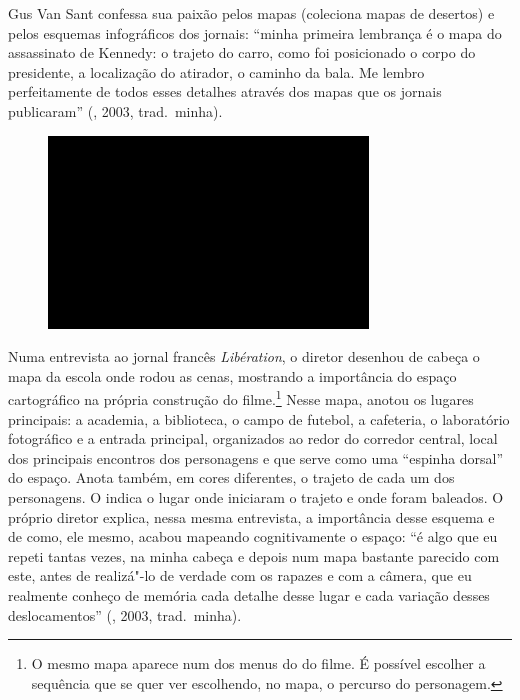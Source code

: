 Gus Van Sant confessa sua paixão pelos mapas (coleciona mapas de
desertos) e pelos esquemas infográficos dos jornais: ``minha primeira
lembrança é o mapa do assassinato de Kennedy: o trajeto do carro, como
foi posicionado o corpo do presidente, a localização do atirador, o
caminho da bala. Me lembro perfeitamente de todos esses detalhes através
dos mapas que os jornais publicaram'' (, 2003, trad.~minha).

\begin{figure}[!ht]

\centering
 \includegraphics[width=85mm]{./imgs/im1.jpg}
\caption{\tiny{}}

\end{figure}


Numa entrevista ao jornal francês \emph{Libération}, o diretor desenhou
de cabeça o mapa da escola onde rodou as cenas, mostrando a importância
do espaço cartográfico na própria construção do filme.\footnote{O mesmo
  mapa aparece num dos menus do  do filme. É possível escolher a
  sequência que se quer ver escolhendo, no mapa, o percurso do
  personagem.} Nesse mapa, anotou os lugares principais: a academia, a
biblioteca, o campo de futebol, a cafeteria, o laboratório fotográfico e
a entrada principal, organizados ao redor do corredor central, local dos
principais encontros dos personagens e que serve como uma ``espinha
dorsal'' do espaço. Anota também, em cores diferentes, o trajeto de cada
um dos personagens. O  indica o lugar onde iniciaram o trajeto e onde
foram baleados. O próprio diretor explica, nessa mesma entrevista, a
importância desse esquema e de como, ele mesmo, acabou mapeando
cognitivamente o espaço: ``é algo que eu repeti tantas vezes, na minha
cabeça e depois num mapa bastante parecido com este, antes de realizá"-lo
de verdade com os rapazes e com a câmera, que eu realmente conheço de
memória cada detalhe desse lugar e cada variação desses deslocamentos''
(, 2003, trad.~minha).

